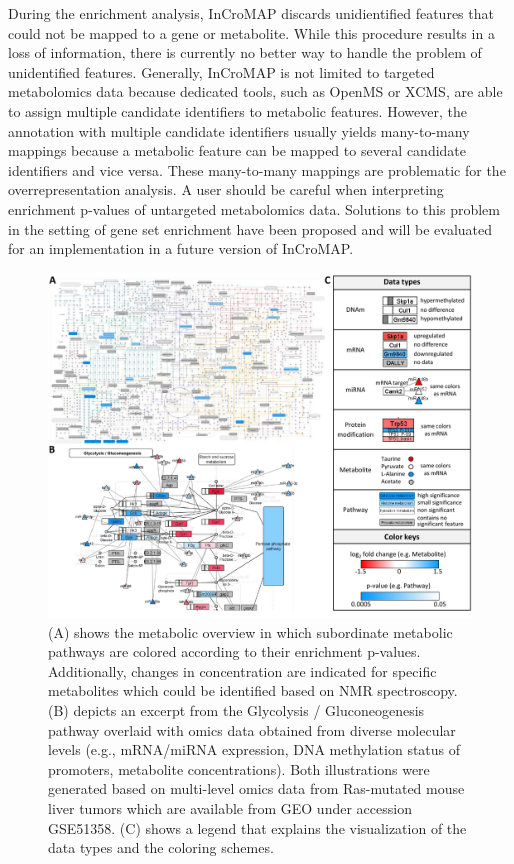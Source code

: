 \documentclass[final,5p,times,twocolumn]{elsarticle}
\newcommand\red[1]{{\color{red}#1}}
\begin{document}
During the enrichment analysis, InCroMAP discards unidientified features that could not be mapped to a gene or metabolite. While this procedure results in a loss of information, there is currently no better way to handle the problem of unidentified features. \red{Generally, InCroMAP is not limited to targeted metabolomics data because dedicated tools, such as OpenMS or XCMS, are able to assign multiple candidate identifiers to metabolic features. However, the annotation with multiple candidate identifiers usually yields many-to-many mappings because a metabolic feature can be mapped to several candidate identifiers and vice versa. These many-to-many mappings are problematic for the overrepresentation analysis. A user should be careful when interpreting enrichment p-values of untargeted metabolomics data. Solutions to this problem in the setting of gene set enrichment have been proposed \cite{Kankainen2011} and will be evaluated for an implementation in a future version of InCroMAP.}

\begin{figure}
\center
\includegraphics[width=1.0\textwidth]{InCroMAP_examples.pdf}
\caption{\red{(A) shows the metabolic overview in which subordinate metabolic pathways are colored according to their enrichment p-values. Additionally, changes in concentration are indicated for specific metabolites which could be identified based on NMR spectroscopy. (B) depicts an excerpt from the Glycolysis / Gluconeogenesis pathway overlaid with omics data obtained from diverse molecular levels (e.g., mRNA/miRNA expression, DNA methylation status of promoters, metabolite concentrations). Both illustrations were generated based on multi-level omics data from Ras-mutated mouse liver tumors which are available from GEO under accession GSE51358.} (C) shows a legend that explains the visualization of the data types and the coloring schemes.}
\label{fig:incromap-examples}
\end{figure}
\end{document}
